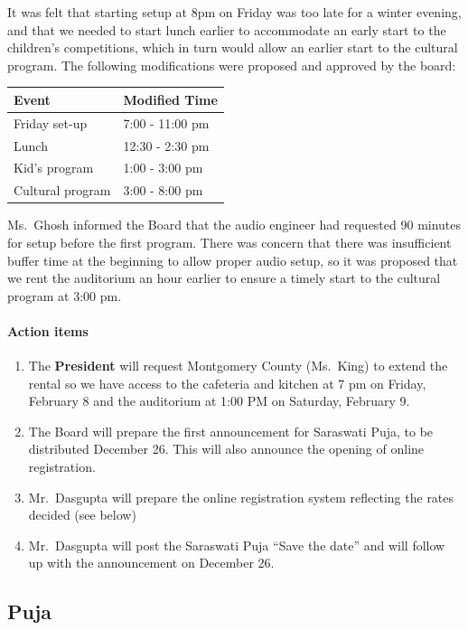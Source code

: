 \documentclass[12pt,]{article}
\providecommand{\tightlist}{%
  \setlength{\itemsep}{0pt}\setlength{\parskip}{0pt}}
\let\oldparagraph\paragraph
\renewcommand{\paragraph}[1]{\oldparagraph{#1}\mbox{}}
\begin{document}
It was felt that starting setup at 8pm on Friday was too late for a
winter evening, and that we needed to start lunch earlier to accommodate
an early start to the children's competitions, which in turn would allow
an earlier start to the cultural program. The following modifications
were proposed and approved by the board:

\begin{longtable}[]{@{}ll@{}}
\toprule
Event & Modified Time\tabularnewline
\midrule
\endhead
Friday set-up & 7:00 - 11:00 pm\tabularnewline
Lunch & 12:30 - 2:30 pm\tabularnewline
Kid's program & 1:00 - 3:00 pm\tabularnewline
Cultural program & 3:00 - 8:00 pm\tabularnewline
\bottomrule
\end{longtable}

Ms.~Ghosh informed the Board that the audio engineer had requested 90
minutes for setup before the first program. There was concern that there
was insufficient buffer time at the beginning to allow proper audio
setup, so it was proposed that we rent the auditorium an hour earlier to
ensure a timely start to the cultural program at 3:00 pm.

\hypertarget{action-items}{%
\paragraph{Action items}\label{action-items}}

\begin{enumerate}
\def\labelenumi{\arabic{enumi}.}
\tightlist
\item
  The \textbf{President} will request Montgomery County (Ms.~King) to
  extend the rental so we have access to the cafeteria and kitchen at 7
  pm on Friday, February 8 and the auditorium at 1:00 PM on Saturday,
  February 9.
\item
  The Board will prepare the first announcement for Saraswati Puja, to
  be distributed December 26. This will also announce the opening of
  online registration.
\item
  Mr.~Dasgupta will prepare the online registration system reflecting
  the rates decided (see below)
\item
  Mr.~Dasgupta will post the Saraswati Puja ``Save the date'' and will
  follow up with the announcement on December 26.
\end{enumerate}

\hypertarget{puja}{%
\subsection{Puja}\label{puja}}
\end{document}

